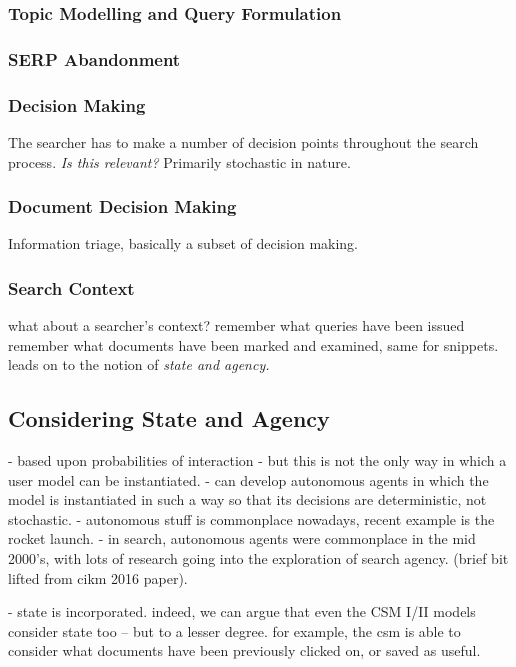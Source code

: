 \subsubsection{Topic Modelling and Query Formulation}

\subsubsection{SERP Abandonment}

\subsubsection{Decision Making}
The searcher has to make a number of decision points throughout the search process.
\emph{Is this relevant?}
Primarily stochastic in nature.

\subsubsection{Document Decision Making}
Information triage, basically a subset of decision making.

\subsubsection{Search Context}
what about a searcher's context?
remember what queries have been issued
remember what documents have been marked and examined, same for snippets.
leads on to the notion of \emph{state and agency.}

\subsection{Considering State and Agency}
- based upon probabilities of interaction
- but this is not the only way in which a user model can be instantiated.
- can develop autonomous agents in which the model is instantiated in such a way so that its decisions are deterministic, not stochastic.
- autonomous stuff is commonplace nowadays, recent example is the rocket launch.
- in search, autonomous agents were commonplace in the mid 2000's, with lots of research going into the exploration of search agency. (brief bit lifted from cikm 2016 paper).

- state is incorporated. indeed, we can argue that even the CSM I/II models consider state too -- but to a lesser degree. for example, the csm is able to consider what documents have been previously clicked on, or saved as useful.

